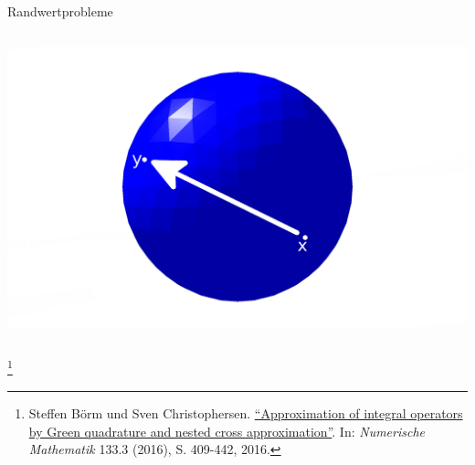 \documentclass[10pt]{beamer}
\let\svthefootnote\thefootnote
\begin{document}
\begin{frame}{Randwertprobleme}
\begin{columns}
\begin{overprint}
        \includegraphics[width=1.5\linewidth]{figures/fg-sphere-full-inf.pdf}
      \end{overprint}

  \end{columns}
  \footnotesize
  \let\thefootnote\relax\footnote{Steffen Börm und Sven Christophersen.
  \href{https://link.springer.com/article/10.1007\%2Fs00211-015-0757-y}{
  ``Approximation of integral operators by Green quadrature and nested cross 
  approximation''}. In: \textit{Numerische Mathematik} 133.3 (2016), S. 
  409-442, 2016.}
  \addtocounter{footnote}{-1}\let\thefootnote\svthefootnote\relax
  \normalsize
\end{frame}
\end{document}
